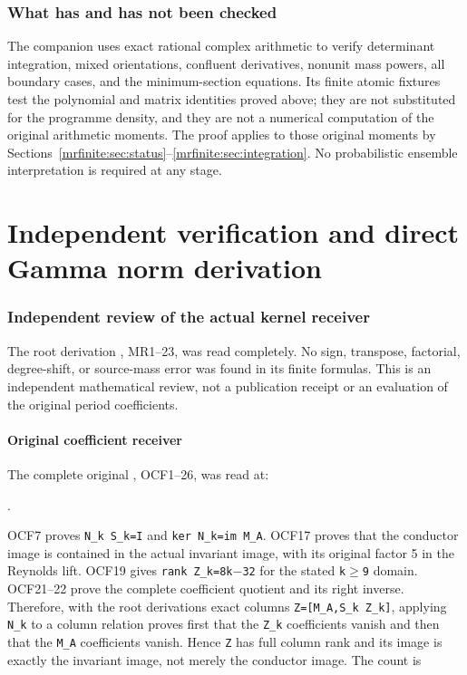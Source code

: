 \documentclass[11pt]{article}
\begin{document}
\section{What has and has not been checked}\label{mrfinite:sec:checks}

The companion  uses exact rational complex
arithmetic to verify determinant integration, mixed orientations,
confluent derivatives, nonunit mass powers, all boundary cases, and the
minimum-section equations. Its finite atomic fixtures test the
polynomial and matrix identities proved above; they are not substituted
for the programme density, and they are not a numerical computation of
the original arithmetic moments. The proof applies to those original
moments by Sections~\ref{mrfinite:sec:status}--\ref{mrfinite:sec:integration}.
No probabilistic ensemble interpretation is required at any stage.

\endgroup

\clearpage\begingroup
\part*{Independent verification and direct Gamma norm derivation}
\providecommand{\mrreviewtightlist}{\setlength{\itemsep}{0pt}\setlength{\parskip}{0pt}}

\section{Independent review of the actual kernel receiver}\label{mrreview:independent-review-of-the-actual-kernel-receiver}

The root derivation , MR1--23, was read completely. No sign, transpose, factorial, degree-shift, or source-mass error was found in its finite formulas. This is an independent mathematical review, not a publication receipt or an evaluation of the original period coefficients.

\subsection{Original coefficient receiver}\label{mrreview:original-coefficient-receiver}

The complete original , OCF1--26, was read at:

.

OCF7 proves \texttt{N\_k\ S\_k=I} and \texttt{ker\ N\_k=im\ M\_A}. OCF17 proves that the conductor image is contained in the actual invariant image, with its original factor 5 in the Reynolds lift. OCF19 gives \texttt{rank\ Z\_k=8k\ensuremath{-}32} for the stated \texttt{k\ensuremath{\ge}9} domain. OCF21--22 prove the complete coefficient quotient and its right inverse. Therefore, with the root derivation\textquotesingle s exact columns \texttt{Z={[}M\_A,S\_k\ Z\_k{]}}, applying \texttt{N\_k} to a column relation proves first that the \texttt{Z\_k} coefficients vanish and then that the \texttt{M\_A} coefficients vanish. Hence \texttt{Z} has full column rank and its image is exactly the invariant image, not merely the conductor image. The count is
\end{document}
